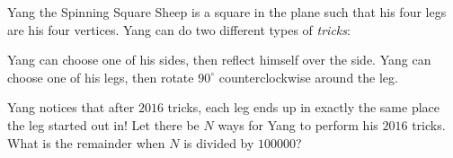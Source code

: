 Yang the Spinning Square Sheep is a square in the plane such that his four legs are his four vertices. Yang can do two different types of \emph{tricks}:

\begin{enumerate}

Yang can choose one of his sides, then reflect himself over the side.
Yang can choose one of his legs, then rotate $90^\circ$ counterclockwise around the leg.

\end{enumerate}

Yang notices that after $2016$ tricks, each leg ends up in exactly the same place the leg started out in! Let there be $N$ ways for Yang to perform his $2016$ tricks. What is the remainder when $N$ is divided by $100000$?
